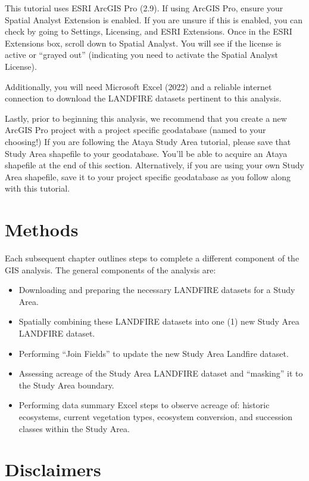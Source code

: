 \documentclass[
]{book}
\providecommand{\tightlist}{%
  \setlength{\itemsep}{0pt}\setlength{\parskip}{0pt}}
\begin{document}
This tutorial uses ESRI ArcGIS Pro (2.9). If using ArcGIS Pro, ensure your Spatial Analyst Extension is enabled. If you are unsure if this is enabled, you can check by going to Settings, Licensing, and ESRI Extensions. Once in the ESRI Extensions box, scroll down to Spatial Analyst. You will see if the license is active or ``grayed out'' (indicating you need to activate the Spatial Analyst License).

Additionally, you will need Microsoft Excel (2022) and a reliable internet connection to download the LANDFIRE datasets pertinent to this analysis.

Lastly, prior to beginning this analysis, we recommend that you create a new ArcGIS Pro project with a project specific geodatabase (named to your choosing!) If you are following the Ataya Study Area tutorial, please save that Study Area shapefile to your geodatabase. You'll be able to acquire an Ataya shapefile at the end of this section. Alternatively, if you are using your own Study Area shapefile, save it to your project specific geodatabase as you follow along with this tutorial.

\hypertarget{methods}{%
\section{Methods}\label{methods}}

Each subsequent chapter outlines steps to complete a different component of the GIS analysis. The general components of the analysis are:

\begin{itemize}
\tightlist
\item
  Downloading and preparing the necessary LANDFIRE datasets for a Study Area.
\item
  Spatially combining these LANDFIRE datasets into one (1) new Study Area LANDFIRE dataset.
\item
  Performing ``Join Fields'' to update the new Study Area Landfire dataset.
\item
  Assessing acreage of the Study Area LANDFIRE dataset and ``masking'' it to the Study Area boundary.
\item
  Performing data summary Excel steps to observe acreage of: historic ecosystems, current vegetation types, ecosystem conversion, and succession classes within the Study Area.
\end{itemize}

\hypertarget{disclaimers}{%
\section{Disclaimers}\label{disclaimers}}
\end{document}
